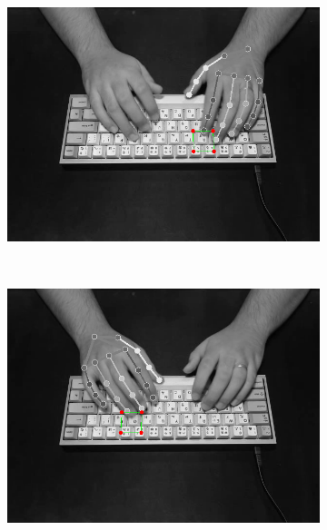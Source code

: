 \documentclass{report}
\begin{document}
\begin{figure}[H]
\centering
\begin{subfigure}{.5\textwidth}
  \centering
  \includegraphics[width=.995\linewidth]{failure-3.png}
\end{subfigure}\\
\begin{subfigure}{.5\textwidth}
  \centering
  \includegraphics[width=.995\linewidth]{failure-1.png}
\end{subfigure}%
\begin{subfigure}{.5\textwidth}
  \centering

\end{subfigure}
\end{figure}
\end{document}

